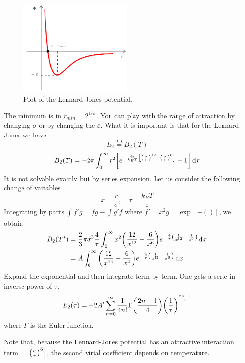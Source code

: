 \documentclass[../main/main.tex]{subfiles}
\begin{document}
\begin{figure}[h!]
\centering
\includegraphics[width=0.5\textwidth]{../lessons/15_image/2.pdf}
\caption{\label{fig:} Plot of the Lennard-Jones potential.}
\end{figure}
 The minimum is in \( r_{min}=2^{1/\sigma } \).   You can play with the range of attraction by changing \( \sigma  \) or by changing the   \( \varepsilon  \).
 What it is important is that for the Lennard-Jones we have
 \begin{equation}
   B_2 \overset{LJ}{=} B_2 (T)
 \end{equation}
\begin{equation}
  B_2 (T) = - 2 \pi \int_{0}^{\infty } r^2 \qty[e^{- \frac{4 \varepsilon }{k_B T} \qty[\qty(\frac{\sigma }{r})^{12} - \qty(\frac{\sigma }{r})^6] } -1] \dd[]{r}
\end{equation}
It is not solvable exactly but by series expansion. Let us consider the following change of variables
\begin{equation}
  x = \frac{r}{\sigma }, \quad \tau = \frac{k_B T}{\varepsilon }
\end{equation}
Integrating by parts \( \int_{}^{} f' g = fg - \int_{}^{} g' f    \) where \( f' = x^2 g = \exp [-()]   \), we obtain
\begin{equation}
\begin{split}
  B_2 (T^*) &= \frac{2}{3} \pi \sigma ^3 \frac{4}{\tau } \int_{0}^{\infty } x^2  \qty(\frac{12}{x^{12}}- \frac{6}{x^6}) e^{- \frac{4}{\tau } \qty(\frac{1}{x^{12}} - \frac{1}{x^6}) }  \dd[]{x}  \\
  & = A \int_{0}^{\infty } \qty(\frac{12}{x^{16}}- \frac{6}{x^4}) e^{- \frac{4}{\tau } \qty(\frac{1}{x^{12}} - \frac{1}{x^6}) } \dd[]{x}
\end{split}
\end{equation}
Expand the exponential and then integrate term by term. One gets a serie in inverse power of \( \tau  \).
\begin{equation}
  B_2 (\tau ) = - 2 A' \sum_{n=0}^{\infty } \frac{1}{4n!} \Gamma \qty(\frac{2n-1}{4}) \qty(\frac{1}{\tau })^{\frac{2n+1}{4}}
\end{equation}
where \( \Gamma  \) is the Euler function.
\begin{remark}
Note that, because the Lennard-Jones potential has an attractive interaction term \( \qty[- \qty(\frac{\sigma }{r})^6 ]  \), the second virial coefficient depends on temperature.
\end{remark}
\end{document}
